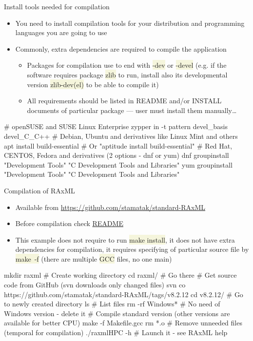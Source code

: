\documentclass[compress, xelatex, 11pt, xcolor=svgnames, aspectratio=169,
	hyperref={
		bookmarks=true,
		unicode=true,
		colorlinks=true,
		pdftitle={Linux, command line and MetaCentrum},
		plainpages=false,
		pdfauthor={Vojtech Zeisek},
		pdfsubject={Course about use of Linux command line, writing shell scripts and using MetaCentrum of CESNET},
		pdfcreator={XeLaTeX},
		pdfkeywords={Linux, GNU, BASH, shell, command line, MetaCentrum},
		linkcolor=DarkRed, %
		anchorcolor=DarkBlue, %
		citecolor=Indigo, %
		filecolor=NavyBlue, %
		menucolor=DarkMagenta, %
		urlcolor=DarkBlue, %
		},
	url={hyphens, lowtilde} %
	]{beamer}
\renewcommand{\texttt}[1]{\colorbox{Beige}{{\ttfamily #1}}}
\begin{document}
\begin{frame}[fragile]{Install tools needed for compilation}
	\begin{itemize}
		\item You need to install compilation tools for your distribution and programming languages you are going to use
		\item Commonly, extra dependencies are required to compile the application
		\begin{itemize}
			\item Packages for compilation use to end with \texttt{-dev} or \texttt{-devel} (e.g. if the software requires package \texttt{zlib} to run, install also its developmental version \texttt{zlib-dev(el)} to be able to compile it)
			\item All requirements should be listed in README and/or INSTALL documents of particular package --- user must install them manually\ldots
		\end{itemize}
	\end{itemize}
	\vfill
	\begin{bashcode}
    # openSUSE and SUSE Linux Enterprise
    zypper in -t pattern devel_basis devel_C_C++
    # Debian, Ubuntu and derivatives like Linux Mint and others
    apt install build-essential # Or "aptitude install build-essential"
    # Red Hat, CENTOS, Fedora and derivatives (2 options - dnf or yum)
    dnf groupinstall "Development Tools" "C Development Tools and Libraries"
    yum groupinstall "Development Tools" "C Development Tools and Libraries"
	\end{bashcode}
\end{frame}

\begin{frame}[fragile]{Compilation of RAxML}
	\begin{itemize}
		\item Available from \url{https://github.com/stamatak/standard-RAxML}
		\item Before compilation check \href{https://github.com/stamatak/standard-RAxML/blob/master/README.md}{README}
		\item This example does not require to run \texttt{make install}, it does not have extra dependencies for compilation, it requires specifying of particular source file by \texttt{make~-f} (there are multiple \texttt{GCC} files, no one main)
	\end{itemize}
	\begin{bashcode}
    mkdir raxml # Create working directory
    cd raxml/ # Go there
    # Get source code from GitHub (svn downloads only changed files)
    svn co https://github.com/stamatak/standard-RAxML/tags/v8.2.12
    cd v8.2.12/ # Go to newly created directory
    ls # List files
    rm -rf Windows* # No need of Windows version - delete it
    # Compile standard version (other versions are available for better CPU)
    make -f Makefile.gcc
    rm *.o # Remove unneeded files (temporal for compilation)
    ./raxmlHPC -h # Launch it - see RAxML help
	\end{bashcode}
\end{frame}
\end{document}
